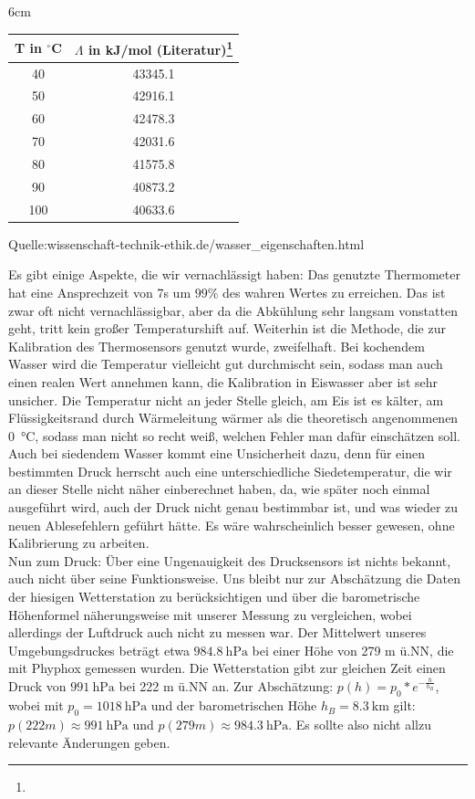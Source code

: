 \documentclass[]{article}
\begin{document}
	\begin{center}
		\begin{minipage*}{6cm}
		\begin{tabular}{|c|c|}
			\hline
			T in $^\circ$C &  $\Lambda$ in kJ/mol (Literatur)\footnote{}\\
			\hline
			\hline
			40 & 43345.1\\
			\hline
			50  & 42916.1\\
			\hline
			60 & 42478.3\\
			\hline
			70 & 42031.6\\
			\hline
			80 & 41575.8\\
			\hline
			90 & 40873.2\\
			\hline
			100 & 40633.6\\
			\hline  			
		\end{tabular}\par
		\bigskip
		Quelle:wissenschaft-technik-ethik.de/wasser\_eigenschaften.html
	\end{minipage*}
	\end{center}
	Es gibt einige Aspekte, die wir vernachlässigt haben:
	Das genutzte Thermometer hat eine Ansprechzeit von 7s um $99\%$ des wahren Wertes zu erreichen. Das ist zwar oft nicht vernachlässigbar, aber da die Abkühlung sehr langsam vonstatten geht, tritt kein großer Temperaturshift auf.
	Weiterhin ist die Methode, die zur Kalibration des Thermosensors genutzt wurde, zweifelhaft. Bei kochendem Wasser wird die Temperatur vielleicht gut durchmischt sein, sodass man auch einen realen Wert annehmen kann, die Kalibration in Eiswasser aber ist sehr unsicher. Die Temperatur nicht an jeder Stelle gleich, am Eis ist es kälter, am Flüssigkeitsrand durch Wärmeleitung wärmer als die theoretisch angenommenen \SI{0}{\celsius}, sodass man nicht so recht weiß, welchen Fehler man dafür einschätzen soll. Auch bei siedendem Wasser kommt eine Unsicherheit dazu, denn für einen bestimmten Druck herrscht auch eine unterschiedliche Siedetemperatur, die wir an dieser Stelle nicht näher einberechnet haben, da, wie später noch einmal ausgeführt wird, auch der Druck nicht genau bestimmbar ist, und was wieder zu neuen Ablesefehlern geführt hätte.
	Es wäre wahrscheinlich besser gewesen, ohne Kalibrierung zu arbeiten.\\
	Nun zum Druck: Über eine Ungenauigkeit des Drucksensors ist nichts bekannt, auch nicht über seine Funktionsweise. Uns bleibt nur zur Abschätzung die Daten der hiesigen Wetterstation zu berücksichtigen und über die barometrische Höhenformel näherungsweise mit unserer Messung zu vergleichen, wobei allerdings der Luftdruck auch nicht zu messen war. Der Mittelwert unseres Umgebungsdruckes beträgt etwa $\SI{984.8}{\hecto \pascal}$ bei einer Höhe von 279 m ü.NN, die mit Phyphox gemessen wurden. Die Wetterstation gibt zur gleichen Zeit einen Druck von $\SI{991}{\hecto \pascal}$ bei 222 m ü.NN an. Zur Abschätzung: $p(h)=p_0*e^{-\frac{h}{h_B}}$, wobei mit $p_0=\SI{1018}{\hecto \pascal}$ und der barometrischen Höhe $h_B=\SI{8.3}{\kilo \meter}$ gilt: $p(222m) \approx \SI{991}{\hecto \pascal}$ und $p(279m) \approx \SI{984.3}{\hecto \pascal}$. Es sollte also nicht allzu relevante Änderungen geben.\\
\end{document}
